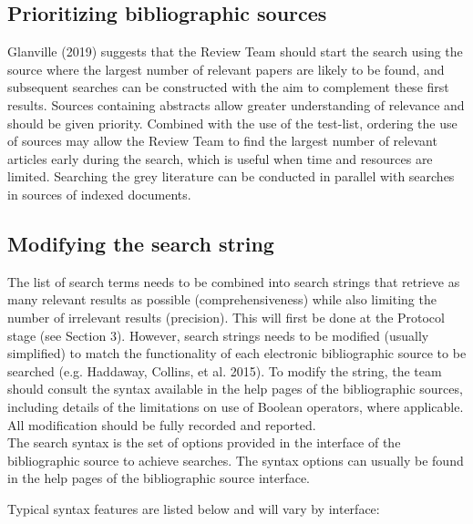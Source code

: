 \documentclass[
  letterpaper,
  DIV=11,
  numbers=noendperiod]{scrreprt}
\begin{document}
\subsection{Prioritizing bibliographic
sources}\label{prioritizing-bibliographic-sources}

Glanville (2019) suggests that the Review Team should start the search
using the source where the largest number of relevant papers are likely
to be found, and subsequent searches can be constructed with the aim to
complement these first results. Sources containing abstracts allow
greater understanding of relevance and should be given priority.
Combined with the use of the test-list, ordering the use of sources may
allow the Review Team to find the largest number of relevant articles
early during the search, which is useful when time and resources are
limited. Searching the grey literature can be conducted in parallel with
searches in sources of indexed documents.

\subsection{Modifying the search
string}\label{modifying-the-search-string}

The list of search terms needs to be combined into search strings that
retrieve as many relevant results as possible (comprehensiveness) while
also limiting the number of irrelevant results (precision). This will
first be done at the Protocol stage (see Section 3). However, search
strings needs to be modified (usually simplified) to match the
functionality of each electronic bibliographic source to be searched
(e.g. Haddaway, Collins, et al. 2015). To modify the string, the team
should consult the syntax available in the help pages of the
bibliographic sources, including details of the limitations on use of
Boolean operators, where applicable. All modification should be fully
recorded and reported.\\
The search syntax is the set of options provided in the interface of the
bibliographic source to achieve searches. The syntax options can usually
be found in the help pages of the bibliographic source interface.

Typical syntax features are listed below and will vary by interface:
\end{document}
